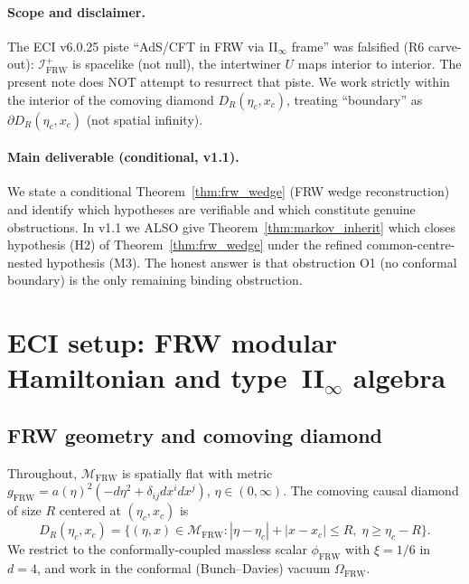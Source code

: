\documentclass[11pt,a4paper]{article}
\theoremstyle{remark}
\newcommand{\FRW}{{\mathrm{FRW}}}
\newcommand{\DR}{D_R(\eta_c,x_c)}
\begin{document}
\paragraph{Scope and disclaimer.}
The ECI v6.0.25 piste ``AdS/CFT in FRW via II$_\infty$ frame'' was falsified
(R6 carve-out): $\mathcal{I}^+_{\FRW}$ is spacelike (not null), the
intertwiner $U$ maps interior to interior.  The present note does NOT
attempt to resurrect that piste.  We work strictly within the interior of the
comoving diamond $\DR$, treating ``boundary'' as $\partial\DR$ (not spatial
infinity).

\paragraph{Main deliverable (conditional, v1.1).}
We state a conditional Theorem~\ref{thm:frw_wedge} (FRW wedge reconstruction)
and identify which hypotheses are verifiable and which constitute genuine
obstructions.  In v1.1 we ALSO give Theorem~\ref{thm:markov_inherit} which
closes hypothesis (H2) of Theorem~\ref{thm:frw_wedge} under the refined
common-centre-nested hypothesis (M3).  The honest answer is that
obstruction O1 (no conformal boundary) is the only remaining binding
obstruction.

\section{ECI setup: FRW modular Hamiltonian and type~II$_\infty$ algebra}
\label{sec:setup}

\subsection{FRW geometry and comoving diamond}

Throughout, $\mathcal{M}_{\FRW}$ is spatially flat with metric
$g_{\FRW} = a(\eta)^2(-d\eta^2 + \delta_{ij}dx^i dx^j)$, $\eta\in(0,\infty)$.
The comoving causal diamond of size $R$ centered at $(\eta_c, x_c)$ is
\begin{equation}
  \DR = \bigl\{(\eta,x)\in\mathcal{M}_{\FRW} :
    |\eta-\eta_c| + |x-x_c| \le R,\; \eta \ge \eta_c - R\bigr\}.
\label{eq:diamond}
\end{equation}
We restrict to the conformally-coupled massless scalar $\phi_{\FRW}$ with
$\xi=1/6$ in $d=4$, and work in the conformal (Bunch--Davies) vacuum
$\Omega_{\FRW}$.
\end{document}
